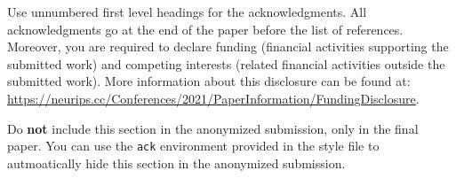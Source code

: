 \documentclass{article}
\begin{document}




\begin{ack}
Use unnumbered first level headings for the acknowledgments. All acknowledgments
go at the end of the paper before the list of references. Moreover, you are required to declare
funding (financial activities supporting the submitted work) and competing interests (related financial activities outside the submitted work).
More information about this disclosure can be found at: \url{https://neurips.cc/Conferences/2021/PaperInformation/FundingDisclosure}.

Do {\bf not} include this section in the anonymized submission, only in the final paper. You can use the \texttt{ack} environment provided in the style file to autmoatically hide this section in the anonymized submission.
\end{ack}

\small{



}
\end{document}
